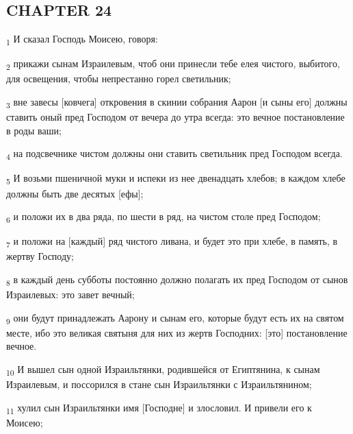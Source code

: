 \subsection{CHAPTER 24}
\begin{tcolorbox}
\textsubscript{1} И сказал Господь Моисею, говоря:
\end{tcolorbox}
\begin{tcolorbox}
\textsubscript{2} прикажи сынам Израилевым, чтоб они принесли тебе елея чистого, выбитого, для освещения, чтобы непрестанно горел светильник;
\end{tcolorbox}
\begin{tcolorbox}
\textsubscript{3} вне завесы [ковчега] откровения в скинии собрания Аарон [и сыны его] должны ставить оный пред Господом от вечера до утра всегда: это вечное постановление в роды ваши;
\end{tcolorbox}
\begin{tcolorbox}
\textsubscript{4} на подсвечнике чистом должны они ставить светильник пред Господом всегда.
\end{tcolorbox}
\begin{tcolorbox}
\textsubscript{5} И возьми пшеничной муки и испеки из нее двенадцать хлебов; в каждом хлебе должны быть две десятых [ефы];
\end{tcolorbox}
\begin{tcolorbox}
\textsubscript{6} и положи их в два ряда, по шести в ряд, на чистом столе пред Господом;
\end{tcolorbox}
\begin{tcolorbox}
\textsubscript{7} и положи на [каждый] ряд чистого ливана, и будет это при хлебе, в память, в жертву Господу;
\end{tcolorbox}
\begin{tcolorbox}
\textsubscript{8} в каждый день субботы постоянно должно полагать их пред Господом от сынов Израилевых: это завет вечный;
\end{tcolorbox}
\begin{tcolorbox}
\textsubscript{9} они будут принадлежать Аарону и сынам его, которые будут есть их на святом месте, ибо это великая святыня для них из жертв Господних: [это] постановление вечное.
\end{tcolorbox}
\begin{tcolorbox}
\textsubscript{10} И вышел сын одной Израильтянки, родившейся от Египтянина, к сынам Израилевым, и поссорился в стане сын Израильтянки с Израильтянином;
\end{tcolorbox}
\begin{tcolorbox}
\textsubscript{11} хулил сын Израильтянки имя [Господне] и злословил. И привели его к Моисею;
\end{tcolorbox}
